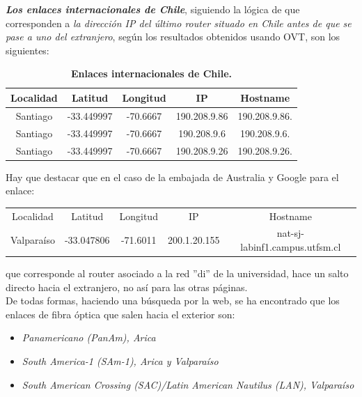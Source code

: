 \documentclass[12pt]{article}
\begin{document}
\textbf{\textit{Los enlaces internacionales de Chile}}, siguiendo la lógica de que corresponden a \emph{la dirección IP del último router situado en Chile antes de que se pase a uno del extranjero}, según los resultados obtenidos usando OVT, son los siguientes:

\begin{table}[H]
\centering
\begin{tabular}{| c | c | c | c | c |}
\hline
Localidad & Latitud & Longitud & IP & Hostname\\
\hline
Santiago & -33.449997 & -70.6667 & 190.208.9.86 & 190.208.9.86.\\
\hline
Santiago & -33.449997 & -70.6667 & 190.208.9.6 & 190.208.9.6.\\
\hline
Santiago & -33.449997 & -70.6667 & 190.208.9.26 & 190.208.9.26.\\
\hline
\end{tabular}
\caption{\small \textbf{Enlaces internacionales de Chile.}}
\end{table}

Hay que destacar que en el caso de la embajada de Australia y Google para el enlace:

\begin{table}[H]
\centering
\begin{tabular}{ c  c  c  c  c }
Localidad & Latitud & Longitud & IP & Hostname\\
Valparaíso & -33.047806 & -71.6011 & 200.1.20.155 & nat-sj-labinf1.campus.utfsm.cl\\
\end{tabular}
\end{table}

que corresponde al router asociado a la red ''di'' de la universidad, hace un salto directo hacia el extranjero, no así para las otras páginas.\\

De todas formas, haciendo una búsqueda por la web, se ha encontrado que los enlaces de fibra óptica que salen hacia el exterior son:

\begin{itemize}
\item {\it Panamericano (PanAm), Arica}
\item {\it South America-1 (SAm-1), Arica y Valparaíso}
\item {\it South American Crossing (SAC)/Latin American Nautilus (LAN), Valparaíso}
\end{itemize}

\newpage
\end{document}
